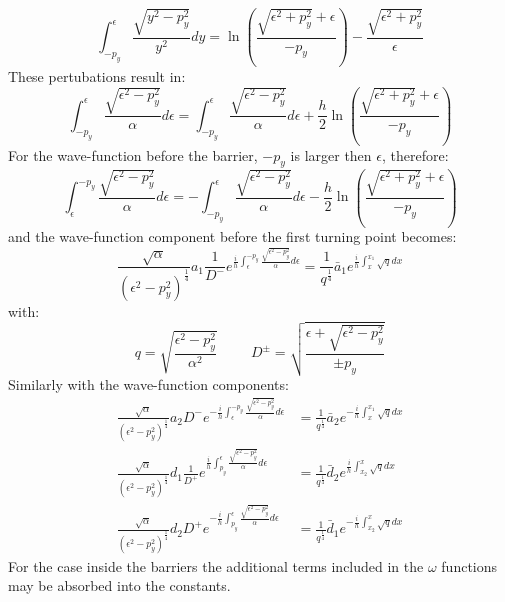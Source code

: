 		\begin{equation}
			\int^{\epsilon}_{-p_{y}}\frac{\sqrt{y^{2}-p_{y}^{2}}}{y^{2}}dy=\ln\left(\frac{\sqrt{\epsilon^{2}+p_{y}^{2}}+\epsilon}{-p_{y}}\right)-\frac{\sqrt{\epsilon^{2}+p_{y}^{2}}}{\epsilon}
		\end{equation}
		These pertubations result in:
		\begin{equation}
			\int^{\epsilon}_{-p_{y}}\frac{\sqrt{\epsilon^{2}-p_{y}^{2}}}{\alpha}d\epsilon=\int^{\epsilon}_{-p_{y}}\frac{\sqrt{\epsilon^{2}-p_{y}^{2}}}{\alpha}d\epsilon+\frac{h}{2}\ln\left(\frac{\sqrt{\epsilon^{2}+p_{y}^{2}}+\epsilon}{-p_{y}}\right)
		\end{equation}
		For the wave-function before the barrier, $-p_{y}$ is larger then $\epsilon$, therefore:
		\begin{equation}
			\int^{-p_{y}}_{\epsilon}\frac{\sqrt{\epsilon^{2}-p_{y}^{2}}}{\alpha}d\epsilon=-\int^{\epsilon}_{-p_{y}}\frac{\sqrt{\epsilon^{2}-p_{y}^{2}}}{\alpha}d\epsilon-\frac{h}{2}\ln\left(\frac{\sqrt{\epsilon^{2}+p_{y}^{2}}+\epsilon}{-p_{y}}\right)
		\end{equation}
		and the wave-function component before the first turning point becomes:
		\begin{equation}
			\frac{\sqrt{\alpha}}{\left(\epsilon^{2}-p_{y}^{2}\right)^{\frac{1}{4}}}a_{1}\frac{1}{D^{-}}e^{\frac{i}{h}\int^{-p_{y}}_{\epsilon}\frac{\sqrt{\epsilon^{2}-p_{y}^{2}}}{\alpha}d\epsilon}=\frac{1}{q^{\frac{1}{4}}}\bar{a}_{1}e^{\frac{i}{h}\int_{x}^{x_{1}} \sqrt{q} dx}
		\end{equation}
		with:
		\begin{equation}
			q=\sqrt{\frac{\epsilon^{2}-p_{y}^{2}}{\alpha^{2}}}
			\hspace{1cm}
			D^{\pm}=\sqrt{\frac{\epsilon+\sqrt{\epsilon^{2}-p_{y}^{2}}}{\pm p_{y}}}
		\end{equation}
		Similarly with the wave-function components:
		\begin{align}
			\frac{\sqrt{\alpha}}{\left(\epsilon^{2}-p_{y}^{2}\right)^{\frac{1}{4}}}a_{2}D^{-}e^{-\frac{i}{h}\int^{-p_{y}}_{\epsilon}\frac{\sqrt{\epsilon^{2}-p_{y}^{2}}}{\alpha}d\epsilon}&=\frac{1}{q^{\frac{1}{4}}}\bar{a}_{2}e^{-\frac{i}{h}\int_{x}^{x_{1}} \sqrt{q} dx}\\
			\frac{\sqrt{\alpha}}{\left(\epsilon^{2}-p_{y}^{2}\right)^{\frac{1}{4}}}d_{1}\frac{1}{D^{+}}e^{\frac{i}{h}\int^{\epsilon}_{p_{y}}\frac{\sqrt{\epsilon^{2}-p_{y}^{2}}}{\alpha}d\epsilon}&=\frac{1}{q^{\frac{1}{4}}}\bar{d}_{2}e^{\frac{i}{h}\int_{x_{2}}^x \sqrt{q} dx}\\
			\frac{\sqrt{\alpha}}{\left(\epsilon^{2}-p_{y}^{2}\right)^{\frac{1}{4}}}d_{2}D^{+}e^{-\frac{i}{h}\int^{\epsilon}_{p_{y}}\frac{\sqrt{\epsilon^{2}-p_{y}^{2}}}{\alpha}d\epsilon}&=\frac{1}{q^{\frac{1}{4}}}\bar{d}_{1}e^{-\frac{i}{h}\int_{x_{2}}^x \sqrt{q} dx}
		\end{align}
		For the case inside the barriers the additional terms included in the $\omega$ functions may be absorbed into the constants.
%